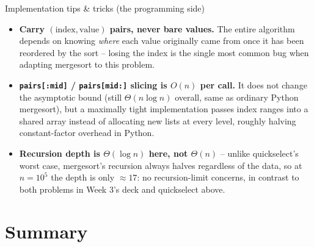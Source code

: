 \documentclass[11pt,aspectratio=169]{beamer}
\begin{document}
\begin{frame}{Implementation tips \& tricks (the programming side)}
  \small
  \begin{itemize}
    \item \textbf{Carry $(\text{index}, \text{value})$ pairs, never bare values.} The
    entire algorithm depends on knowing \emph{where} each value originally came from once
    it has been reordered by the sort -- losing the index is the single most common bug
    when adapting mergesort to this problem.
    \item \textbf{\texttt{pairs[:mid]} / \texttt{pairs[mid:]} slicing is $O(n)$ per call.}
    It does not change the asymptotic bound (still $\Theta(n \log n)$ overall, same as
    ordinary Python mergesort), but a maximally tight implementation passes index ranges
    into a shared array instead of allocating new lists at every level, roughly halving
    constant-factor overhead in Python.
    \item \textbf{Recursion depth is $\Theta(\log n)$ here, not $\Theta(n)$} -- unlike
    quickselect's worst case, mergesort's recursion always halves regardless of the data,
    so at $n=10^5$ the depth is only $\approx 17$: no recursion-limit concerns, in contrast
    to both problems in Week 3's deck and quickselect above.
  \end{itemize}
\end{frame}

\section{Summary}
\end{document}
